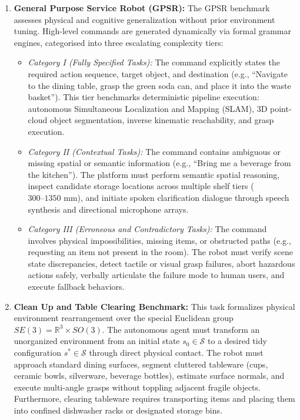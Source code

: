 \begin{enumerate}[leftmargin=1.5em]
  \item \textbf{General Purpose Service Robot (GPSR):} The GPSR benchmark assesses physical and cognitive generalization without prior environment tuning. High-level commands are generated dynamically via formal grammar engines, categorised into three escalating complexity tiers:
  \begin{itemize}[leftmargin=1.2em]
    \item \emph{Category I (Fully Specified Tasks):} The command explicitly states the required action sequence, target object, and destination (e.g., ``Navigate to the dining table, grasp the green soda can, and place it into the waste basket''). This tier benchmarks deterministic pipeline execution: autonomous Simultaneous Localization and Mapping (SLAM), 3D point-cloud object segmentation, inverse kinematic reachability, and grasp execution.
    \item \emph{Category II (Contextual Tasks):} The command contains ambiguous or missing spatial or semantic information (e.g., ``Bring me a beverage from the kitchen''). The platform must perform semantic spatial reasoning, inspect candidate storage locations across multiple shelf tiers ($300\text{--}1350\text{ mm}$), and initiate spoken clarification dialogue through speech synthesis and directional microphone arrays.
    \item \emph{Category III (Erroneous and Contradictory Tasks):} The command involves physical impossibilities, missing items, or obstructed paths (e.g., requesting an item not present in the room). The robot must verify scene state discrepancies, detect tactile or visual grasp failures, abort hazardous actions safely, verbally articulate the failure mode to human users, and execute fallback behaviors.
  \end{itemize}
  
  \item \textbf{Clean Up and Table Clearing Benchmark:} This task formalizes physical environment rearrangement over the special Euclidean group $SE(3) = \mathbb{R}^3 \times SO(3)$. The autonomous agent must transform an unorganized environment from an initial state $s_0 \in \mathcal{S}$ to a desired tidy configuration $s^* \in \mathcal{S}$ through direct physical contact. The robot must approach standard dining surfaces, segment cluttered tableware (cups, ceramic bowls, silverware, beverage bottles), estimate surface normals, and execute multi-angle grasps without toppling adjacent fragile objects. Furthermore, clearing tableware requires transporting items and placing them into confined dishwasher racks or designated storage bins.
  

\end{enumerate}
